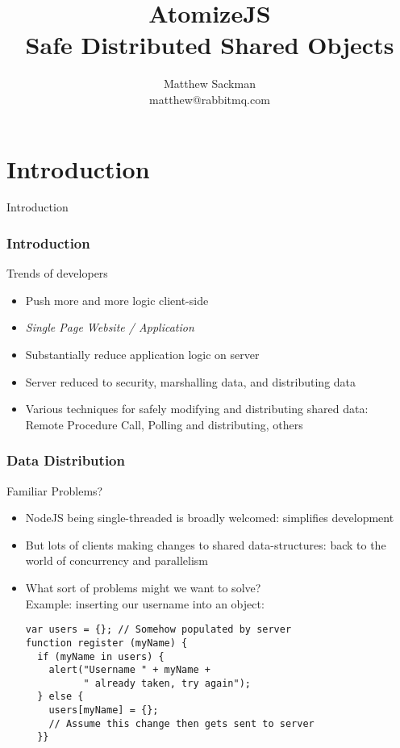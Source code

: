 \documentclass{beamer}
\title[AtomizeJS]{AtomizeJS\\Safe Distributed Shared Objects}
\author[Matthew Sackman]{Matthew Sackman \\\small{matthew@rabbitmq.com}}
\date{}
\begin{document}
\begin{frame}
  \titlepage
\end{frame}

\section{Introduction}

\begin{frame}
  \centering
  \LARGE

  Introduction

\end{frame}

\begin{frame}
  \frametitle{Introduction}

  \begin{block}{Trends of developers}
    \begin{itemize}
    \item
      Push more and more logic client-side
    \item
      {\em Single Page Website / Application}
    \item
      Substantially reduce application logic on server
    \item
      Server reduced to security, marshalling data, and distributing data
      \pause
    \item
      Various techniques for safely modifying and distributing shared data\pause:\\
      Remote Procedure Call, Polling and distributing, others
    \end{itemize}
  \end{block}
\end{frame}

\begin{frame}[fragile]
  \frametitle{Data Distribution}

  \begin{block}{Familiar Problems?}
    \begin{itemize}
    \item
      NodeJS being single-threaded is broadly welcomed: simplifies development
    \item
      But lots of clients making changes to shared data-structures:
      back to the world of concurrency and parallelism
    \item
      What sort of problems might we want to solve?\pause\\
      Example: inserting our username into an object\pause:
      \begin{verbatim}
var users = {}; // Somehow populated by server
function register (myName) {
  if (myName in users) {
    alert("Username " + myName +
          " already taken, try again");
  } else {
    users[myName] = {};
    // Assume this change then gets sent to server
  }}
      \end{verbatim}
    \end{itemize}
  \end{block}
\end{frame}
\end{document}
